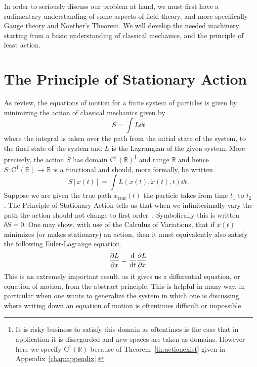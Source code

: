 
In order to seriously discuss our problem at hand, we must first have a
rudimentary understanding of some aspects of field theory, and more specifically
Gauge theory and Noether's Theorem. We will develop the needed machinery
starting from a basic understanding of classical mechanics, and the principle of
least action.

\section{The Principle of Stationary Action}\label{sec:stationary}
As review, the equations of motion for a finite system of particles is given by
minimizing the action of classical mechanics given by
\begin{equation}\label{eq:action}
    S = \int L\dd{t}
\end{equation}
where the integral is taken over the path from the initial state of the system,
to the final state of the system and \(L\) is the Lagrangian of the given
system. More precisely, the action \(S\) has domain
\(\mathrm{C}^1(\mathbb{R})\)\footnote{It is risky business to satisfy this
domain as oftentimes is the case that in application it is disregarded and new
spaces are taken as domains. However here we specify
\(\mathrm{C}^1(\mathbb{R})\) because of Theorem~\ref{th:actionexist} given in
Appendix~\ref{chap:appendix}.} and range \(\mathbb{R}\) and hence
\(S:\mathrm{C}^1(\mathbb{R})\to \mathbb{R}\) is a functional and should, more
formally, be written
\begin{equation}\label{eq:actionFunc}
    S\left[x(t)\right] = \int L(x(t), \dot{x}(t), t)\dd{t}.
\end{equation}
Suppose we are given the true path \(x_\mathrm{true}(t)\) the particle takes
from time \(t_1\) to \(t_2\). The Principle of Stationary Action tells us that
when we infinitesimally vary the path the action should not change to first
order~\cite{feynman}. Symbolically this is written \(\delta S = 0\). One may
show, with use of the Calculus of Variations, that if \(x(t)\) minimizes (or
makes stationary) an action, then it must equivalently also satisfy the
following Euler-Lagrange equation.
\begin{equation}\label{eq:eulerlag}
    \pdv{L}{x} = \dv{t} \pdv{L}{\dot{x}}
\end{equation}
This is an extremely important result, as it gives us a differential equation,
or equation of motion, from the abstract principle. This is helpful in many way,
in particular when one wants to generalize the system in which one is discussing
where writing down an equation of motion is oftentimes difficult or impossible.

